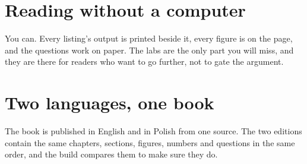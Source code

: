 \section*{Reading without a computer}

You can. Every listing's output is printed beside it, every figure is on the
page, and the questions work on paper. The labs are the only part you will
miss, and they are there for readers who want to go further, not to gate
the argument.

\section*{Two languages, one book}

The book is published in English and in Polish from one source. The two
editions contain the same chapters, sections, figures, numbers and questions
in the same order, and the build compares them to make sure they do.
